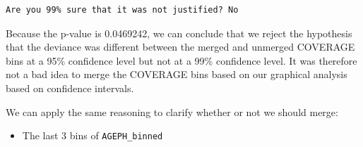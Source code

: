 \documentclass[
  english,
  11pt,
]{article}
\providecommand{\tightlist}{%
  \setlength{\itemsep}{0pt}\setlength{\parskip}{0pt}}
\begin{document}
\begin{verbatim}
Are you 99% sure that it was not justified? No
\end{verbatim}

Because the p-value is 0.0469242, we can conclude that we reject the
hypothesis that the deviance was different between the merged and
unmerged COVERAGE bins at a 95\% confidence level but not at a 99\%
confidence level. It was therefore not a bad idea to merge the COVERAGE
bins based on our graphical analysis based on confidence intervals.

We can apply the same reasoning to clarify whether or not we should
merge:

\begin{itemize}
\tightlist
\item
  The last 3 bins of \texttt{AGEPH\_binned}
\end{itemize}
\end{document}

